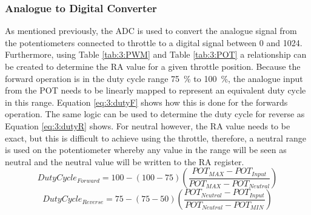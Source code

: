 	\subsubsection{Analogue to Digital Converter}
	As mentioned previously, the ADC is used to convert the analogue signal from the potentiometers connected to throttle to a digital signal between 0 and 1024. Furthermore, using Table \ref{tab:3:PWM} and Table \ref{tab:3:POT} a relationship can be created to determine the RA value for a given throttle position. Because the forward operation is in the duty cycle range \SI{75}{\percent} to \SI{100}{\percent}, the analogue input from the POT needs to be linearly mapped to represent an equivalent duty cycle in this range. Equation \ref{eq:3:dutyF} shows how this is done for the forwards operation. The same logic can be used to determine the duty cycle for reverse as Equation \ref{eq:3:dutyR} shows. For neutral however, the RA value needs to be exact, but this is difficult to achieve using the throttle, therefore, a neutral range is used on the potentiometer whereby any value in the range will be seen as neutral and the neutral value will be written to the RA register.
	\begin{equation}
		Duty Cycle_{Forward} = 100 - (100-75)(\frac{POT_{MAX} - POT_{Input}}{POT_{MAX} - POT_{Neutral}})
		\label{eq:3:dutyF}
	\end{equation}
	\begin{equation}
		Duty Cycle_{Reverse} = 75 - (75-50)(\frac{POT_{Neutral} - POT_{Input}}{POT_{Neutral} - POT_{MIN}})
		\label{eq:3:dutyR}
	\end{equation}

